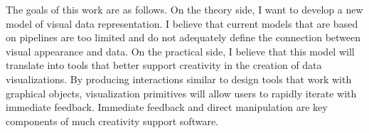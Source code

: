 The goals of this work are as follows.
On the theory side, I want to develop a new model of visual data representation.
I believe that current models that are based on pipelines are too limited and do not adequately define the connection between visual appearance and data.
On the practical side, I believe that this model will translate into tools that better support creativity in the creation of data visualizations.
By producing interactions similar to design tools that work with graphical objects, visualization primitives will allow users to rapidly iterate with immediate feedback.
Immediate feedback and direct manipulation are key components of much creativity support software.